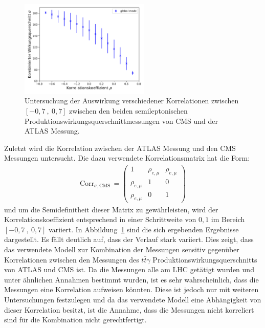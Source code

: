 \begin{figure}
  \centering
  \includegraphics[width=0.55\textwidth]{Plots/corr_CA.pdf}
  \caption{Untersuchung der Auswirkung verschiedener Korrelationen zwischen $[-0,7~,~0,7]$ zwischen den beiden semileptonischen Produktionswirkungsquerschnittmessungen von CMS und der ATLAS Messung.}
  \label{fig:corrCA}
\end{figure}
Zuletzt wird die Korrelation zwischen der ATLAS Messung und den CMS Messungen untersucht. Die dazu verwendete Korrelationsmatrix hat die Form:
\begin{align}
  \text{Corr}_{\sigma,\text{CMS}}\,=\begin{pmatrix}
  1 & \rho_{e, \mu} & \rho_{e, \mu}\\
  \rho_{e, \mu} & 1 &0\\
  \rho_{e, \mu} & 0 & 1
  \end{pmatrix}
  \label{eqn:matrix2}
\end{align}
und um die Semidefinitheit dieser Matrix zu gewährleisten, wird der Korrelationskoeffizient entsprechend in einer Schrittweite von $0,1$ im Bereich $[-0,7~,~0,7]$ variiert. In Abbildung~\ref{fig:corrCA} sind die sich ergebenden Ergebnisse dargestellt. Es fällt deutlich auf, dass der Verlauf stark variiert. Dies zeigt, dass das verwendete Modell zur Kombination der Messungen sensitiv gegenüber Korrelationen zwischen den Messungen des $t\bar{t}\gamma$ Produktionswirkungsquerschnitts von ATLAS und CMS ist.
Da die Messungen alle am LHC getätigt wurden und unter ähnlichen Annahmen bestimmt wurden, ist es sehr wahrscheinlich, dass die Messungen eine Korrelation aufweisen könnten. Diese ist jedoch nur mit weiteren Untersuchungen festzulegen und da das verwendete Modell eine Abhängigkeit von dieser Korrelation besitzt, ist die Annahme, dass die Messungen nicht korreliert sind für die Kombination nicht gerechtfertigt.

